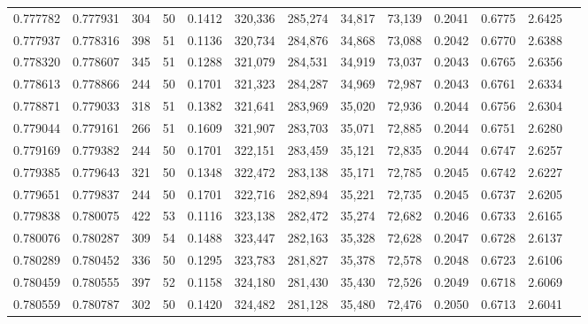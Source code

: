\begin{tabular}{rrrrrrrrrrrrr}
0.777782 & 0.777931 &   304 &  50 &                                     0.1412 & 320,336 & 285,274 &  34,817 &  73,139 & 0.2041 & 0.6775 & 2.6425 \\
0.777937 & 0.778316 &   398 &  51 &                                     0.1136 & 320,734 & 284,876 &  34,868 &  73,088 & 0.2042 & 0.6770 & 2.6388 \\
0.778320 & 0.778607 &   345 &  51 &                                     0.1288 & 321,079 & 284,531 &  34,919 &  73,037 & 0.2043 & 0.6765 & 2.6356 \\
0.778613 & 0.778866 &   244 &  50 &                                     0.1701 & 321,323 & 284,287 &  34,969 &  72,987 & 0.2043 & 0.6761 & 2.6334 \\
0.778871 & 0.779033 &   318 &  51 &                                     0.1382 & 321,641 & 283,969 &  35,020 &  72,936 & 0.2044 & 0.6756 & 2.6304 \\
0.779044 & 0.779161 &   266 &  51 &                                     0.1609 & 321,907 & 283,703 &  35,071 &  72,885 & 0.2044 & 0.6751 & 2.6280 \\
0.779169 & 0.779382 &   244 &  50 &                                     0.1701 & 322,151 & 283,459 &  35,121 &  72,835 & 0.2044 & 0.6747 & 2.6257 \\
0.779385 & 0.779643 &   321 &  50 &                                     0.1348 & 322,472 & 283,138 &  35,171 &  72,785 & 0.2045 & 0.6742 & 2.6227 \\
0.779651 & 0.779837 &   244 &  50 &                                     0.1701 & 322,716 & 282,894 &  35,221 &  72,735 & 0.2045 & 0.6737 & 2.6205 \\
0.779838 & 0.780075 &   422 &  53 &                                     0.1116 & 323,138 & 282,472 &  35,274 &  72,682 & 0.2046 & 0.6733 & 2.6165 \\
0.780076 & 0.780287 &   309 &  54 &                                     0.1488 & 323,447 & 282,163 &  35,328 &  72,628 & 0.2047 & 0.6728 & 2.6137 \\
0.780289 & 0.780452 &   336 &  50 &                                     0.1295 & 323,783 & 281,827 &  35,378 &  72,578 & 0.2048 & 0.6723 & 2.6106 \\
0.780459 & 0.780555 &   397 &  52 &                                     0.1158 & 324,180 & 281,430 &  35,430 &  72,526 & 0.2049 & 0.6718 & 2.6069 \\
0.780559 & 0.780787 &   302 &  50 &                                     0.1420 & 324,482 & 281,128 &  35,480 &  72,476 & 0.2050 & 0.6713 & 2.6041 \\

\end{tabular}

